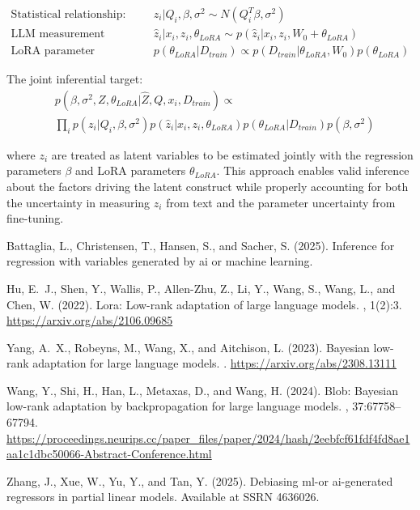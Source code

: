 \documentclass[11pt]{article}
\begin{document}
\begin{align}
\text{Statistical relationship:} \quad &z_i|Q_i, \beta, \sigma^2 \sim N(Q_i^T\beta, \sigma^2) \label{eq:stat_relationship} \\
\text{LLM measurement process:} \quad &\hat{z}_i|x_i, z_i, \theta_{LoRA} \sim p(\hat{z}_i|x_i, z_i, W_0 + \theta_{LoRA}) \label{eq:llm_measurement} \\
\text{LoRA parameter posterior:} \quad &p(\theta_{LoRA}|D_{train}) \propto p(D_{train}|\theta_{LoRA}, W_0)p(\theta_{LoRA}) \label{eq:lora_posterior2}
\end{align}

The joint inferential target:
\begin{align}
&p(\beta, \sigma^2, Z, \theta_{LoRA}|\hat{Z}, Q, x_i, D_{train}) \propto \label{eq:joint_target2} \\
&\prod_i p(z_i|Q_i, \beta, \sigma^2)p(\hat{z}_i|x_i, z_i, \theta_{LoRA})p(\theta_{LoRA}|D_{train})p(\beta, \sigma^2) \nonumber
\end{align}

where $z_i$ are treated as latent variables to be estimated jointly with the regression parameters $\beta$ and LoRA parameters $\theta_{LoRA}$. This approach enables valid inference about the factors driving the latent construct while properly accounting for both the uncertainty in measuring $z_i$ from text and the parameter uncertainty from fine-tuning.

\newpage

\begin{thebibliography}{99}

Battaglia, L., Christensen, T., Hansen, S., and Sacher, S. (2025).
\newblock Inference for regression with variables generated by ai or machine learning.

Hu, E.~J., Shen, Y., Wallis, P., Allen-Zhu, Z., Li, Y., Wang, S., Wang, L., and Chen, W. (2022).
\newblock Lora: Low-rank adaptation of large language models.
, 1(2):3.
\newblock \url{https://arxiv.org/abs/2106.09685}

Yang, A.~X., Robeyns, M., Wang, X., and Aitchison, L. (2023).
\newblock Bayesian low-rank adaptation for large language models.
.
\newblock \url{https://arxiv.org/abs/2308.13111}

Wang, Y., Shi, H., Han, L., Metaxas, D., and Wang, H. (2024).
\newblock Blob: Bayesian low-rank adaptation by backpropagation for large language models.
, 37:67758--67794.
\newblock \url{https://proceedings.neurips.cc/paper_files/paper/2024/hash/2eebfcf61fdf4fd8ae1aa1c1dbc50066-Abstract-Conference.html}

Zhang, J., Xue, W., Yu, Y., and Tan, Y. (2025).
\newblock Debiasing ml-or ai-generated regressors in partial linear models.
\newblock Available at SSRN 4636026.

\end{thebibliography}
\end{document}
